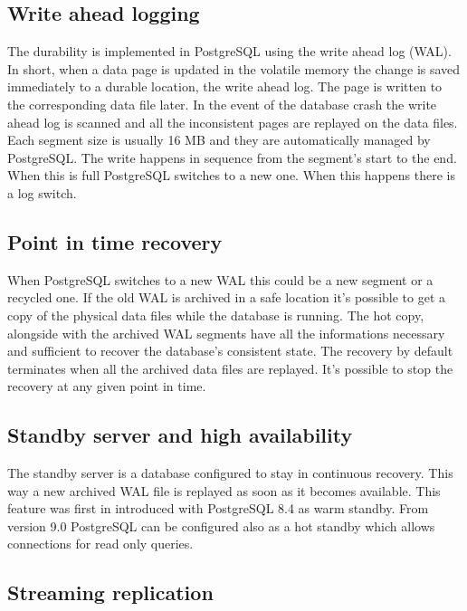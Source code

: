 \subsection{Write ahead logging}

The durability is implemented in PostgreSQL using the write ahead log (WAL).
In short, when a data page is updated in the volatile memory the change is
saved immediately to a durable location, the write ahead
log. The page is written to the corresponding
data file later. In the event of the database crash the write ahead log is
scanned and all the inconsistent pages are replayed on the data files. Each
segment size is usually 16 MB and they are automatically managed by PostgreSQL.
The write happens in sequence from the segment's start to the end. When this is
full PostgreSQL switches to a new one. When this happens there is a log switch.

\subsection{Point in time recovery}

When PostgreSQL
switches to a new WAL this could be a new segment or a recycled one. If the old
WAL is archived in a safe location it's possible to get a copy of the physical
data files while the database is running.  The hot copy, alongside with the
archived WAL segments have all the informations necessary and sufficient to
recover the database's consistent state. The recovery by default terminates
when all the archived data files are replayed. It's possible to stop the
recovery at any given point in time.

\subsection{Standby server and high availability}

The standby server is a database
configured to stay in continuous recovery. This way a new archived WAL file is
replayed as soon as it becomes available. This feature was first in introduced
with  PostgreSQL 8.4 as warm standby. From version 9.0
PostgreSQL can be configured also as a hot standby which
allows connections for read only queries.

\subsection{Streaming replication}

